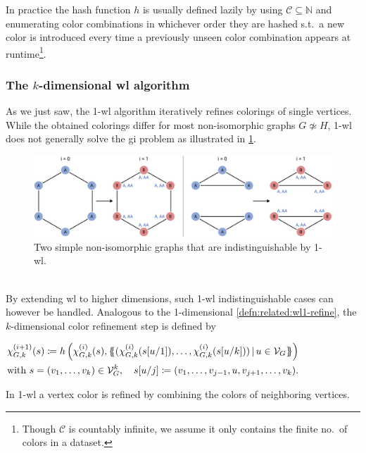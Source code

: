 In practice the hash function $h$ is usually defined lazily by using $\mathcal{C} \subseteq \mathbb{N}$ and enumerating color combinations in whichever order they are hashed s.t.\ a new color is introduced every time a previously unseen color combination appears at runtime\footnote{
	Though $\mathcal{C}$ is countably infinite, we assume it only contains the finite no.\ of colors in a dataset.
}.

\subsubsection{The $k$-dimensional \acs{wl} algorithm}
As we just saw, the 1-\acs{wl} algorithm iteratively refines colorings of single vertices.
While the obtained colorings differ for most non-isomorphic graphs $G \not\simeq H$, 1-\acs{wl} does not generally solve the \ac{gi} problem as illustrated in \cref{fig:related:wl1-problem}.
\begin{figure}[ht]
	\centering
	\includegraphics[width=\linewidth]{gfx/related-work/wl1-problem.pdf}
	\caption[Two simple non-isomorphic graphs that are indistinguishable by 1-\acs{wl}.]{
		Two simple non-isomorphic graphs that are indistinguishable by 1-\acs{wl}.
	}\label{fig:related:wl1-problem}
\end{figure}\\
By extending \ac{wl} to higher dimensions, such 1-\acs{wl} indistinguishable cases can however be handled.
Analogous to the 1-dimensional \cref{defn:related:wl1-refine}, the $k$-dimensional color refinement step is defined by
\begin{defn}\label{defn:related:wlk-refine}
	$\begin{aligned}[t]
		\chi_{G,k}^{(i+1)}(s) \coloneqq h\left(\chi_{G,k}^{(i)}(s), \ldblbrace (\chi_{G,k}^{(i)}(s[u/1]), \dots, \chi_{G,k}^{(i)}(s[u/k]))\, |\, u \in \mathcal{V}_G \rdblbrace\right)\\
		\text{with } s = (v_1, \dots, v_k) \in \mathcal{V}_G^k,\quad s[u/j] \coloneqq (v_1, \dots, v_{j-1}, u, v_{j+1}, \dots, v_k) \text{.}
	\end{aligned}$
\end{defn}
In 1-\acs{wl} a vertex color is refined by combining the colors of neighboring vertices.
